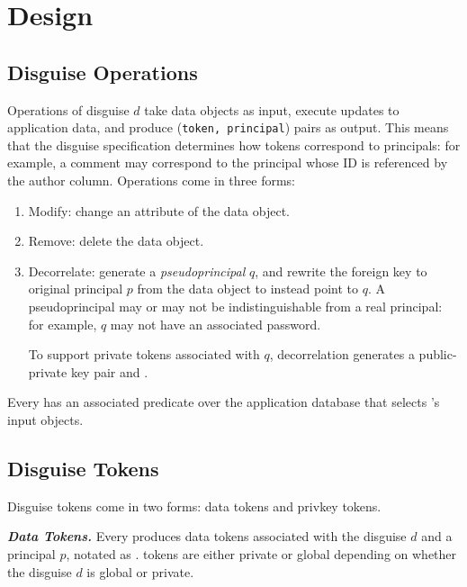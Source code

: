 \section{Design} 

\subsection{Disguise Operations} 
Operations  of disguise $d$ take data objects as input, execute updates to application
data, and produce (\texttt{token, principal}) pairs
as output. This means that the disguise specification determines how tokens correspond to
principals: for example, a comment may correspond to the principal whose ID is referenced by the
author column.
Operations come in three forms:
\begin{enumerate}
    \item Modify: change an attribute of the data object.
    \item Remove: delete the data object.
    \item Decorrelate: generate a \emph{pseudoprincipal} $q$, and rewrite the foreign key to original
        principal $p$ from the data object to instead point to $q$.
        A pseudoprincipal may or may not be indistinguishable from a real principal: for example,
        $q$ may not have an associated password.

        To support private tokens associated with $q$, decorrelation generates a
        public-private key pair  and .
\end{enumerate}
Every  has an associated predicate over the application database that selects 's input objects.

\subsection{Disguise Tokens} 
Disguise tokens come in two forms: data tokens and privkey tokens.

\vspace{6pt}
\noindent\textbf{\emph{Data Tokens.}}
Every  produces data tokens associated with the disguise $d$ and a
principal $p$, notated as .  tokens are either private or global depending on
whether the disguise $d$ is global or private. 

